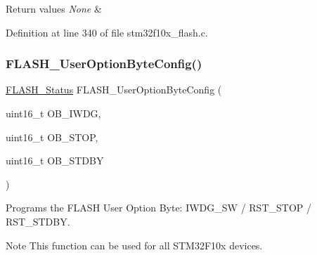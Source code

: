 \begin{DoxyRetVals}{Return values}
{\em None} & \\
\hline
\end{DoxyRetVals}


Definition at line 340 of file stm32f10x\+\_\+flash.\+c.

\mbox{\label{group___f_l_a_s_h___exported___functions_gaae1c493bb06c930ceb84dedfdb7325f6}} 
\subsubsection{\texorpdfstring{F\+L\+A\+S\+H\+\_\+\+User\+Option\+Byte\+Config()}{FLASH\_UserOptionByteConfig()}}
{\footnotesize\ttfamily \hyperlink{group___f_l_a_s_h___exported___types_gadc63a6f3404ff1f71229a66915e9cdc0}{F\+L\+A\+S\+H\+\_\+\+Status} F\+L\+A\+S\+H\+\_\+\+User\+Option\+Byte\+Config (\begin{DoxyParamCaption}\item[{uint16\+\_\+t}]{O\+B\+\_\+\+I\+W\+DG,  }\item[{uint16\+\_\+t}]{O\+B\+\_\+\+S\+T\+OP,  }\item[{uint16\+\_\+t}]{O\+B\+\_\+\+S\+T\+D\+BY }\end{DoxyParamCaption})}



Programs the F\+L\+A\+SH User Option Byte\+: I\+W\+D\+G\+\_\+\+SW / R\+S\+T\+\_\+\+S\+T\+OP / R\+S\+T\+\_\+\+S\+T\+D\+BY. 

\begin{DoxyNote}{Note}
This function can be used for all S\+T\+M32\+F10x devices. 
\end{DoxyNote}

